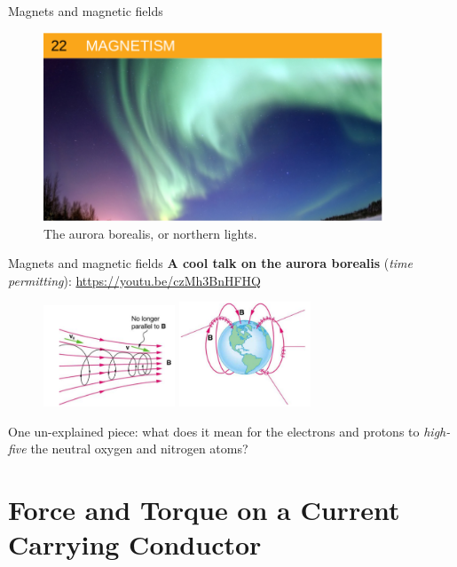 \documentclass{beamer}
\begin{document}
\begin{frame}{Magnets and magnetic fields}
\begin{figure}
\centering
\includegraphics[width=0.9\textwidth]{figures/aurora.png}
\caption{\label{fig:aurora} The aurora borealis, or northern lights.}
\end{figure}
\end{frame}

\begin{frame}{Magnets and magnetic fields}
\textbf{\alert{A cool talk on the aurora borealis}} (\textit{time permitting}):
\url{https://youtu.be/czMh3BnHFHQ} \\
\begin{figure}
\centering
\includegraphics[width=0.35\textwidth]{figures/mag1.png}
\includegraphics[width=0.35\textwidth]{figures/mag2.png}
\end{figure}
One un-explained piece: what does it mean for the electrons and protons to \textit{high-five} the neutral oxygen and nitrogen atoms?
\end{frame}

\section{Force and Torque on a Current Carrying Conductor}
\end{document}
